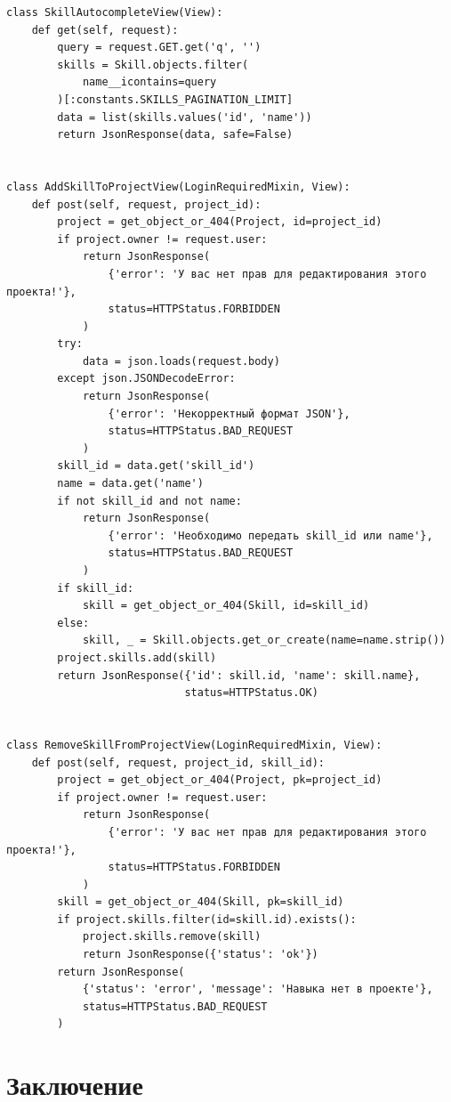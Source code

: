 \documentclass[bachelor, och, pract]{../SCWorks}
\begin{document}
\begin{lstlisting}
class SkillAutocompleteView(View):
    def get(self, request):
        query = request.GET.get('q', '')
        skills = Skill.objects.filter(
            name__icontains=query
        )[:constants.SKILLS_PAGINATION_LIMIT]
        data = list(skills.values('id', 'name'))
        return JsonResponse(data, safe=False)


class AddSkillToProjectView(LoginRequiredMixin, View):
    def post(self, request, project_id):
        project = get_object_or_404(Project, id=project_id)
        if project.owner != request.user:
            return JsonResponse(
                {'error': 'У вас нет прав для редактирования этого проекта!'},
                status=HTTPStatus.FORBIDDEN
            )
        try:
            data = json.loads(request.body)
        except json.JSONDecodeError:
            return JsonResponse(
                {'error': 'Некорректный формат JSON'},
                status=HTTPStatus.BAD_REQUEST
            )
        skill_id = data.get('skill_id')
        name = data.get('name')
        if not skill_id and not name:
            return JsonResponse(
                {'error': 'Необходимо передать skill_id или name'},
                status=HTTPStatus.BAD_REQUEST
            )
        if skill_id:
            skill = get_object_or_404(Skill, id=skill_id)
        else:
            skill, _ = Skill.objects.get_or_create(name=name.strip())
        project.skills.add(skill)
        return JsonResponse({'id': skill.id, 'name': skill.name},
                            status=HTTPStatus.OK)


class RemoveSkillFromProjectView(LoginRequiredMixin, View):
    def post(self, request, project_id, skill_id):
        project = get_object_or_404(Project, pk=project_id)
        if project.owner != request.user:
            return JsonResponse(
                {'error': 'У вас нет прав для редактирования этого проекта!'},
                status=HTTPStatus.FORBIDDEN
            )
        skill = get_object_or_404(Skill, pk=skill_id)
        if project.skills.filter(id=skill.id).exists():
            project.skills.remove(skill)
            return JsonResponse({'status': 'ok'})
        return JsonResponse(
            {'status': 'error', 'message': 'Навыка нет в проекте'},
            status=HTTPStatus.BAD_REQUEST
        )
\end{lstlisting}

\newpage
\section{Заключение}
\end{document}
